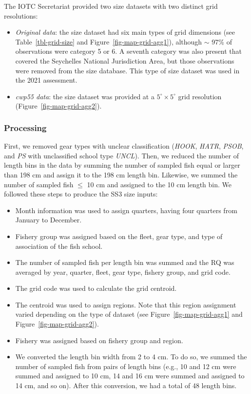 \documentclass[
]{scrartcl}
\providecommand{\tightlist}{%
  \setlength{\itemsep}{0pt}\setlength{\parskip}{0pt}}\usepackage{longtable,booktabs,array}
\begin{document}
The IOTC Secretariat provided two size datasets with two distinct grid
resolutions:

\begin{itemize}
\tightlist
\item
  \emph{Original data}: the size dataset had six main types of grid
  dimensions (see Table~\ref{tbl-grid-size} and
  Figure~\ref{fig-map-grid-agg1}), although \(\sim\) 97\% of
  observations were category 5 or 6. A seventh category was also present
  that covered the Seychelles National Jurisdiction Area, but those
  observations were removed from the size database. This type of size
  dataset was used in the 2021 assessment.
\item
  \emph{cwp55 data}: the size dataset was provided at a
  \(5^\circ\times 5^\circ\) grid resolution
  (Figure~\ref{fig-map-grid-agg2}).
\end{itemize}

\subsubsection{Processing}\label{processing-1}

First, we removed gear types with unclear classification (\emph{HOOK},
\emph{HATR}, \emph{PSOB}, and \emph{PS} with unclassified school type
\emph{UNCL}). Then, we reduced the number of length bins in the data by
summing the number of sampled fish equal or larger than 198 cm and
assign it to the 198 cm length bin. Likewise, we summed the number of
sampled fish \(\leq\) 10 cm and assigned to the 10 cm length bin. We
followed these steps to produce the SS3 size inputs:

\begin{itemize}
\tightlist
\item
  Month information was used to assign quarters, having four quarters
  from January to December.
\item
  Fishery group was assigned based on the fleet, gear type, and type of
  association of the fish school.
\item
  The number of sampled fish per length bin was summed and the RQ was
  averaged by year, quarter, fleet, gear type, fishery group, and grid
  code.
\item
  The grid code was used to calculate the grid centroid.
\item
  The centroid was used to assign regions. Note that this region
  assignment varied depending on the type of dataset (see
  Figure~\ref{fig-map-grid-agg1} and Figure~\ref{fig-map-grid-agg2}).
\item
  Fishery was assigned based on fishery group and region.
\item
  We converted the length bin width from 2 to 4 cm. To do so, we summed
  the number of sampled fish from pairs of length bins (e.g., 10 and 12
  cm were summed and assigned to 10 cm, 14 and 16 cm were summed and
  assigned to 14 cm, and so on). After this conversion, we had a total
  of 48 length bins.
\end{itemize}
\end{document}
